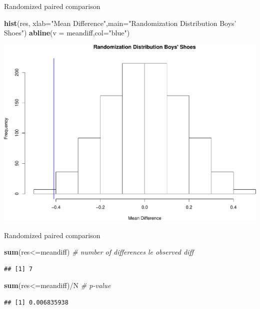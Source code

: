 \documentclass[9pt,ignorenonframetext,]{beamer}
\newenvironment{Shaded}{\begin{snugshade}}{\end{snugshade}}
\newcommand{\KeywordTok}[1]{\textcolor[rgb]{0.13,0.29,0.53}{\textbf{{#1}}}}
\newcommand{\DataTypeTok}[1]{\textcolor[rgb]{0.13,0.29,0.53}{{#1}}}
\newcommand{\StringTok}[1]{\textcolor[rgb]{0.31,0.60,0.02}{{#1}}}
\newcommand{\CommentTok}[1]{\textcolor[rgb]{0.56,0.35,0.01}{\textit{{#1}}}}
\newcommand{\NormalTok}[1]{{#1}}
\begin{document}
\begin{frame}[fragile]{Randomized paired comparison}

\begin{Shaded}
\begin{Highlighting}[]
\KeywordTok{hist}\NormalTok{(res, }\DataTypeTok{xlab=}\StringTok{"Mean Difference"}\NormalTok{,}\DataTypeTok{main=}\StringTok{"Randomization Distribution Boys' Shoes"}\NormalTok{)}
\KeywordTok{abline}\NormalTok{(}\DataTypeTok{v =} \NormalTok{meandiff,}\DataTypeTok{col=}\StringTok{"blue"}\NormalTok{)}
\end{Highlighting}
\end{Shaded}

\includegraphics{class4slides-jan18_files/figure-beamer/unnamed-chunk-22-1.pdf}

\end{frame}

\begin{frame}[fragile]{Randomized paired comparison}

\begin{Shaded}
\begin{Highlighting}[]
\KeywordTok{sum}\NormalTok{(res<=meandiff) }\CommentTok{# number of differences le observed diff}
\end{Highlighting}
\end{Shaded}

\begin{verbatim}
## [1] 7
\end{verbatim}

\begin{Shaded}
\begin{Highlighting}[]
\KeywordTok{sum}\NormalTok{(res<=meandiff)/N }\CommentTok{# p-value}
\end{Highlighting}
\end{Shaded}

\begin{verbatim}
## [1] 0.006835938
\end{verbatim}

\end{frame}
\end{document}
